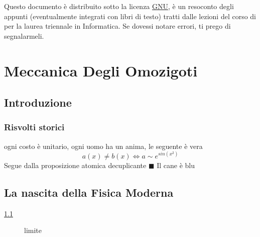 \documentclass[10pt, letterpaper]{report}
\begin{document}
\newpage
\pagecolor{cartaRiciclata}\setmainfont{Algerian}\Large
Questo documento è distribuito sotto la licenza 
\color{blue}\href{https://www.gnu.org/licenses/fdl-1.3.txt}{GNU}\color{black},  
è un resoconto degli appunti (eventualmente integrati con libri di testo) tratti dalle lezioni del corso di \jobname
\hphantom{a}per la laurea 
triennale in Informatica. Se dovessi notare errori, ti prego di segnalarmeli.
\newpage \setmainfont{Times New Roman}\normalsize
\tableofcontents 
\newpage

\fancyhf{}
\fancyhead[L]{\nouppercase{\leftmark}}
\fancyfoot[C]{\thepage}






\chapter{Meccanica Degli Omozigoti}
\section{Introduzione}
\lipsum[1]
\subsection{Risvolti storici}
\lipsum[2]\acc 
{}ogni costo è unitario, ogni uomo ha un anima, le seguente è vera
$$ a(x)\ne b(x)\iff a\sim e^{sin(x^2)}$$
\dimo{}Segue dalla proposizione atomica decuplicante $\blacksquare$\acc \lipsum[2]\acc
\prop{}Il cane è blu \flowerLine 
\section{La nascita della Fisica Moderna}
\lipsum[1] \ref{fig:birds} \lipsum[2]
\begin{figure}[h!]
    \centering
    \caption{limite}
    \label{fig:birds}
\end{figure}\acc
\lipsum[3]
\end{document}
